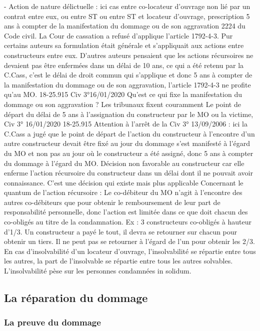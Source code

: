			-	Action de nature délictuelle : ici cas entre co-locateur d’ouvrage non lié par un contrat entre eux, ou entre ST ou entre ST et locateur d’ouvrage, prescription 5 ans à compter de la manifestation du dommage ou de son aggravation 2224 du Code civil. La Cour de cassation a refusé d’applique l’article 1792-4-3. Pur certains auteurs sa formulation était générale et s’appliquait aux actions entre constructeurs entre eux. D’autres auteurs pensaient que les actions récursoires ne devaient pas être enfermées dans un délai de 10 ans, ce qui a été retenu par la C.Cass, c’est le délai de droit commun qui s’applique et donc 5 ans à compter de la manifestation du dommage ou de son aggravation, l’article 1792-4-3 ne profite qu’au MO.
			18-25.915 Civ 3°16/01/2020
			Qu’est ce qui fixe la manifestation du dommage ou son aggravation ?
			Les tribunaux fixent couramment Le point de départ du délai de 5 ans à l’assignation du constructeur par le MO ou la victime, Civ 3° 16/01/2020 18-25.915
			Attention à l’arrêt de la Civ 3° 13/09/2006 : ici la C.Cass a jugé que le point de départ de l’action du constructeur à l’encontre d’un autre constructeur devait être fixé au jour du dommage s’est manifesté à l’égard du MO et non pas au jour où le constructeur a été assigné, donc 5 ans à compter du dommage à l’égard du MO. Décision non favorable au constructeur car elle enferme l’action récursoire du constructeur dans un délai dont il ne pouvait avoir connaissance. C’est une décision qui existe mais plus applicable
			Concernant le quantum de l’action récursoire :
			Le co-débiteur du MO n’agit à l’encontre des autres co-débiteurs que pour obtenir le remboursement de leur part de responsabilité personnelle, donc l’action est limitée dans ce que doit chacun des co-obligés au titre de la condamnation.
			Ex : 3 constructeurs co-obligés à hauteur d’1/3. Un constructeur a payé le tout, il devra se retourner sur chacun pour obtenir un tiers. Il ne peut pas se retourner à l’égard de l’un pour obtenir les 2/3.
			En cas d’insolvabilité d’un locateur d’ouvrage, l’insolvabilité se répartie entre tous les autres, la part de l’insolvable se répartie entre tous les autres solvables. L’insolvabilité pèse sur les personnes condamnées in solidum.

	\subsection{La réparation du dommage}

		\subsubsection{La preuve du dommage}

